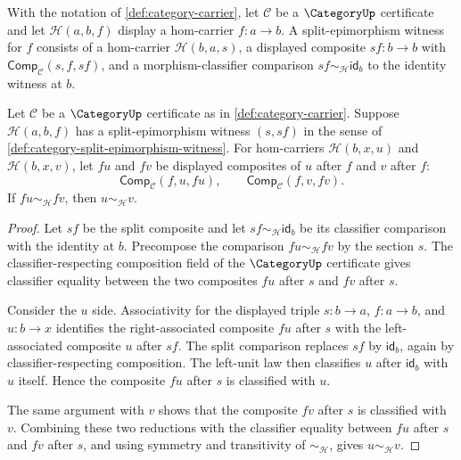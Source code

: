 \begin{definition}
\label{def:category-split-epimorphism-witness}
With the notation of \autoref{def:category-carrier}, let $\mathcal C$ be a
$\CategoryUp$ certificate and let $\mathcal H(a,b,f)$ display a hom-carrier
$f:a\to b$. A split-epimorphism witness for $f$ consists of a hom-carrier
$\mathcal H(b,a,s)$, a displayed composite $sf:b\to b$ with
$\mathsf{Comp}_{\mathcal C}(s,f,sf)$, and a morphism-classifier comparison
$sf\sim_{\mathcal H}\mathsf{id}_b$ to the identity witness at $b$.
\end{definition}

\begin{theorem}
\label{thm:category-split-epimorphism-right-cancellative}
Let $\mathcal C$ be a $\CategoryUp$ certificate as in
\autoref{def:category-carrier}. Suppose $\mathcal H(a,b,f)$ has a
split-epimorphism witness $(s,sf)$ in the sense of
\autoref{def:category-split-epimorphism-witness}. For hom-carriers
$\mathcal H(b,x,u)$ and $\mathcal H(b,x,v)$, let $fu$ and $fv$ be displayed
composites of $u$ after $f$ and $v$ after $f$:
$$
\mathsf{Comp}_{\mathcal C}(f,u,fu),
\qquad
\mathsf{Comp}_{\mathcal C}(f,v,fv).
$$
If $fu\sim_{\mathcal H}fv$, then $u\sim_{\mathcal H}v$.
\end{theorem}
\begin{proof}
Let $sf$ be the split composite and let
$sf\sim_{\mathcal H}\mathsf{id}_b$ be its classifier comparison with the
identity at $b$. Precompose the comparison $fu\sim_{\mathcal H}fv$ by the
section $s$. The classifier-respecting composition field of the $\CategoryUp$
certificate gives classifier equality between the two composites $fu$ after
$s$ and $fv$ after $s$.

Consider the $u$ side. Associativity for the displayed triple $s:b\to a$,
$f:a\to b$, and $u:b\to x$ identifies the right-associated composite $fu$
after $s$ with the left-associated composite $u$ after $sf$. The split
comparison replaces $sf$ by $\mathsf{id}_b$, again by classifier-respecting
composition. The left-unit law then classifies $u$ after $\mathsf{id}_b$ with
$u$ itself. Hence the composite $fu$ after $s$ is classified with $u$.

The same argument with $v$ shows that the composite $fv$ after $s$ is
classified with $v$. Combining these two reductions with the classifier
equality between $fu$ after $s$ and $fv$ after $s$, and using symmetry and
transitivity of $\sim_{\mathcal H}$, gives $u\sim_{\mathcal H}v$.
\end{proof}

